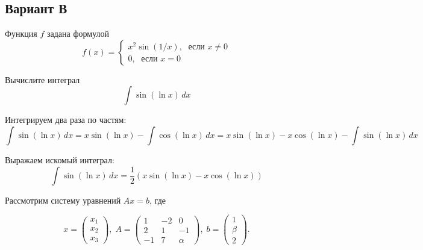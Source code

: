 \documentclass[addpoints, answers]{exam} %
\begin{document}
\subsection{Вариант В}
\begin{questions}

\question Функция $f$ задана формулой 
\[
f(x)=\begin{cases}
x^2\sin(1/x), \; \text{ если } x\neq 0 \\
0, \; \text{ если } x = 0
\end{cases}
\]

\question[10] Вычислите интеграл
\[
\int \sin( \ln x) \, dx
\]

\begin{solution}
Интегрируем два раза по частям:
\[
\int \sin( \ln x) \, dx = 	x \sin( \ln x)  - \int \cos( \ln x) \, dx = x \sin( \ln x)  -  x \cos( \ln x)  - \int \sin( \ln x) \, dx 
\]


Выражаем искомый интеграл:
\[
\int \sin( \ln x) \, dx =\frac{1}{2}\left(  x \sin( \ln x)  -  x \cos( \ln x)  \right)
\]
\end{solution}


\question Рассмотрим систему уравнений $Ax=b$, где 

\[
x=\begin{pmatrix}
x_1 \\
x_2 \\
x_3 
\end{pmatrix}, \; 
A=\begin{pmatrix}
1 & -2 & 0 \\
2 & 1 &  -1\\
-1 & 7 & \alpha  
\end{pmatrix}, \;
b=\begin{pmatrix}
1 \\
\beta \\
2
\end{pmatrix}.
\]


\end{questions}
\end{document}
